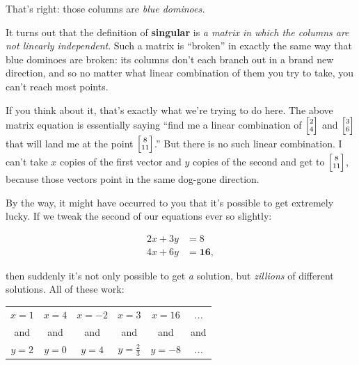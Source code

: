 That's right: those columns are \textit{blue dominoes.}

\medskip

It turns out that the definition of \textbf{singular} is \textit{a matrix in
which the columns are not linearly independent}. Such a matrix is ``broken'' in
exactly the same way that blue dominoes are broken: its columns don't each
branch out in a brand new direction, and so no matter what linear combination
of them you try to take, you can't reach most points.

If you think about it, that's exactly what we're trying to do here. The above
matrix equation is essentially saying ``find me a linear combination of
${\scriptsize \begin{bmatrix} 2 \\ 4 \end{bmatrix}}$ and ${\scriptsize
\begin{bmatrix} 3 \\ 6 \end{bmatrix}}$ that will land me at the point
${\scriptsize \begin{bmatrix} 8 \\ 11 \end{bmatrix}}$.'' But there is no such
linear combination. I can't take $x$ copies of the first vector and $y$ copies
of the second and get to ${\scriptsize \begin{bmatrix} 8 \\ 11 \end{bmatrix}}$,
because those vectors point in the same dog-gone direction.

\medskip

By the way, it might have occurred to you that it's possible to get extremely
lucky. If we tweak the second of our equations ever so slightly:

\vspace{-.25in}
\begin{align*}
2x + 3y &= 8 \\
4x + 6y &= \textbf{16},
\end{align*}
\vspace{-.25in}

then suddenly it's not only possible to get \textit{a} solution, but
\textit{zillions} of different solutions. All of these work:

\begin{center}
\setlength{\tabcolsep}{13pt}
\renewcommand{\arraystretch}{.8}
\begin{tabular}{cccccc}
$x=1$ & $x=4$ & $x=-2$ & $x=3$ & $x=16$ & \textit{...} \\
\scriptsize and &
\scriptsize and &
\scriptsize and &
\scriptsize and &
\scriptsize and &
\scriptsize and\\
$y=2$ & $y=0$ & $y=4$ & $y=\frac{2}{3}$ & $y=-8$ & \textit{...} \\
\end{tabular}
\end{center}


